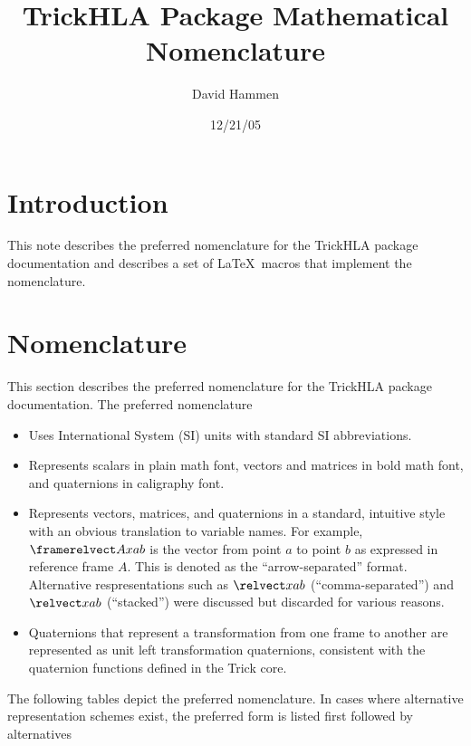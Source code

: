 \documentclass[10pt,landscape]{article}
\begin{document}
\title{TrickHLA Package Mathematical Nomenclature}
\author{David Hammen}
\date{12/21/05}

\maketitle

\tableofcontents

\section*{Introduction}
This note describes the preferred nomenclature for the TrickHLA package
documentation and describes a set of \LaTeX\ macros that implement
the nomenclature.


\pagebreak
\section{Nomenclature}
This section describes the preferred nomenclature for the TrickHLA package
documentation. The preferred nomenclature
\begin{itemize}
\item Uses International System (SI) units with standard SI abbreviations.
\item Represents scalars in plain math font, vectors and matrices in bold math font,
and quaternions in caligraphy font.
\item Represents vectors, matrices, and quaternions in a standard, intuitive style
with an obvious translation to variable names. For example,
$\framerelvect A x a b$ is the vector from point $a$ to point $b$ as expressed in
reference frame $A$. This is denoted as the ``arrow-separated'' format.
Alternative respresentations such as
\trickhlamathcommamode $\relvect x a b$ \trickhlamatharrowmode (``comma-separated'')
and
\trickhlamathstackedmode $\relvect x a b$ \trickhlamatharrowmode (``stacked'')
were
discussed but discarded for various reasons.
\item Quaternions that represent a transformation from one frame to another
are represented as unit left transformation quaternions,
consistent with the quaternion functions defined in the Trick core.
\end{itemize}

The following tables depict the preferred nomenclature.
In cases where alternative representation schemes exist,
the preferred form is listed first followed by alternatives
\end{document}
